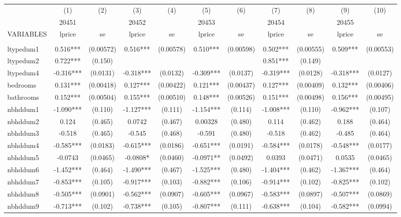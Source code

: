 \documentclass[]{article}
\begin{document}
\begin{tabular}{lcccccccccc} \hline
 & (1) & (2) & (3) & (4) & (5) & (6) & (7) & (8) & (9) & (10) \\
 & 20451 &  & 20452 &  & 20453 &  & 20454 &  & 20455 &  \\
VARIABLES & lprice & se & lprice & se & lprice & se & lprice & se & lprice & se \\ \hline
 &  &  &  &  &  &  &  &  &  &  \\
ltypedum1 & 0.516*** & (0.00572) & 0.516*** & (0.00578) & 0.510*** & (0.00598) & 0.502*** & (0.00555) & 0.509*** & (0.00553) \\
ltypedum2 & 0.722*** & (0.150) &  &  &  &  & 0.851*** & (0.149) &  &  \\
ltypedum4 & -0.316*** & (0.0131) & -0.318*** & (0.0132) & -0.309*** & (0.0137) & -0.319*** & (0.0128) & -0.318*** & (0.0127) \\
bedrooms & 0.131*** & (0.00418) & 0.127*** & (0.00422) & 0.121*** & (0.00437) & 0.127*** & (0.00409) & 0.132*** & (0.00406) \\
bathrooms & 0.152*** & (0.00504) & 0.155*** & (0.00510) & 0.148*** & (0.00526) & 0.151*** & (0.00498) & 0.156*** & (0.00495) \\
nbhddum1 & -1.090*** & (0.110) & -1.127*** & (0.111) & -1.154*** & (0.114) & -1.008*** & (0.110) & -0.962*** & (0.107) \\
nbhddum2 & 0.124 & (0.465) & 0.0742 & (0.467) & 0.00328 & (0.480) & 0.114 & (0.462) & 0.188 & (0.464) \\
nbhddum3 & -0.518 & (0.465) & -0.545 & (0.468) & -0.591 & (0.480) & -0.518 & (0.462) & -0.485 & (0.464) \\
nbhddum4 & -0.585*** & (0.0183) & -0.615*** & (0.0186) & -0.651*** & (0.0191) & -0.584*** & (0.0178) & -0.548*** & (0.0177) \\
nbhddum5 & -0.0743 & (0.0465) & -0.0808* & (0.0460) & -0.0971** & (0.0492) & 0.0393 & (0.0471) & 0.0535 & (0.0465) \\
nbhddum6 & -1.452*** & (0.464) & -1.490*** & (0.467) & -1.525*** & (0.480) & -1.404*** & (0.462) & -1.367*** & (0.464) \\
nbhddum7 & -0.853*** & (0.105) & -0.917*** & (0.103) & -0.882*** & (0.106) & -0.914*** & (0.102) & -0.825*** & (0.102) \\
nbhddum8 & -0.505*** & (0.0901) & -0.562*** & (0.0907) & -0.605*** & (0.0967) & -0.583*** & (0.0897) & -0.507*** & (0.0869) \\
nbhddum9 & -0.713*** & (0.102) & -0.738*** & (0.105) & -0.807*** & (0.111) & -0.638*** & (0.104) & -0.582*** & (0.0994) \\

\end{tabular}
\end{document}

